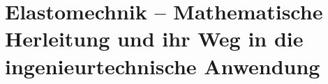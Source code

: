 %
%
%
%
\chapter{Elastomechnik – Mathematische Herleitung und ihr Weg in die ingenieurtechnische Anwendung\label{chapter:elastomechanik}}
\begin{refsection}








\printbibliography[heading=subbibliography]
\end{refsection}
